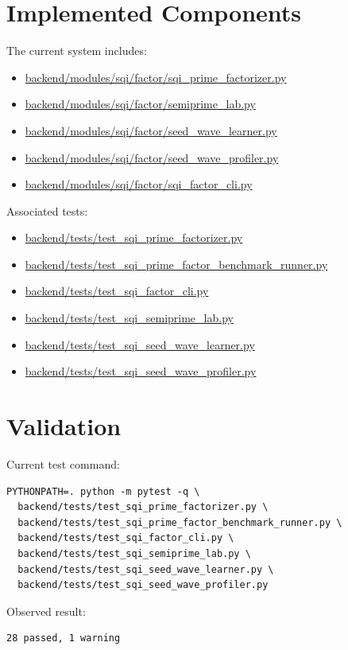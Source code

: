 \documentclass[11pt,a4paper]{article}
\begin{document}
\section{Implemented Components}

The current system includes:

\begin{itemize}
  \item \url{backend/modules/sqi/factor/sqi_prime_factorizer.py}
  \item \url{backend/modules/sqi/factor/semiprime_lab.py}
  \item \url{backend/modules/sqi/factor/seed_wave_learner.py}
  \item \url{backend/modules/sqi/factor/seed_wave_profiler.py}
  \item \url{backend/modules/sqi/factor/sqi_factor_cli.py}
\end{itemize}

Associated tests:

\begin{itemize}
  \item \url{backend/tests/test_sqi_prime_factorizer.py}
  \item \url{backend/tests/test_sqi_prime_factor_benchmark_runner.py}
  \item \url{backend/tests/test_sqi_factor_cli.py}
  \item \url{backend/tests/test_sqi_semiprime_lab.py}
  \item \url{backend/tests/test_sqi_seed_wave_learner.py}
  \item \url{backend/tests/test_sqi_seed_wave_profiler.py}
\end{itemize}

\section{Validation}

Current test command:

\begin{verbatim}
PYTHONPATH=. python -m pytest -q \
  backend/tests/test_sqi_prime_factorizer.py \
  backend/tests/test_sqi_prime_factor_benchmark_runner.py \
  backend/tests/test_sqi_factor_cli.py \
  backend/tests/test_sqi_semiprime_lab.py \
  backend/tests/test_sqi_seed_wave_learner.py \
  backend/tests/test_sqi_seed_wave_profiler.py
\end{verbatim}

Observed result:

\begin{verbatim}
28 passed, 1 warning
\end{verbatim}
\end{document}
